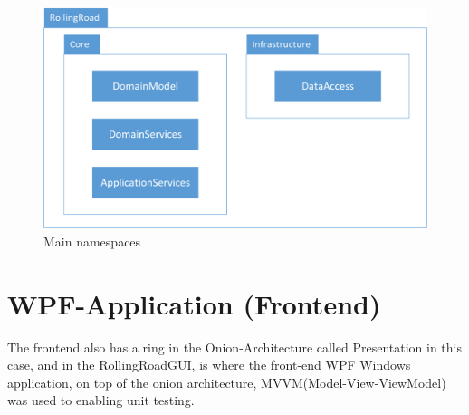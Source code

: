 \begin{figure}
	\centering
	\includegraphics[width=0.7\linewidth]{Images/Namespaces}
	\caption{Main namespaces}
	\label{fig:Namespaces}
\end{figure}

\section{WPF-Application (Frontend)}

The frontend also has a ring in the Onion-Architecture called Presentation in this case, and in the RollingRoadGUI, is where the front-end WPF Windows application, on top of the onion architecture, MVVM(Model-View-ViewModel) was used to enabling unit testing.
